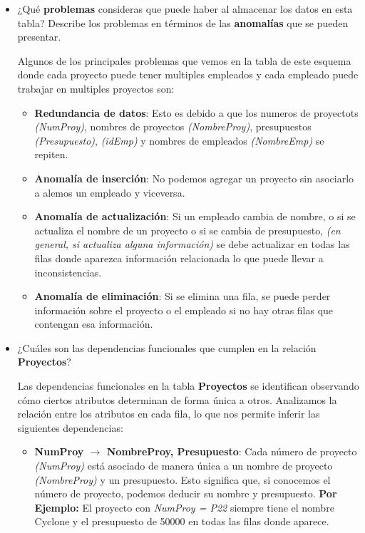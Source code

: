 \begin{itemize}

    \item ¿Qué \textbf{problemas} consideras que puede haber al almacenar los datos en esta tabla? Describe los problemas en
    términos de las \textbf{anomalías} que se pueden presentar. \vspace{1cm}

    Algunos de los principales problemas que vemos en la tabla de este esquema donde cada proyecto puede tener multiples empleados y cada empleado puede trabajar en multiples proyectos son: \vspace{1cm}

    \begin{itemize}
        \item \textbf{Redundancia de datos}: Esto es debido a que los numeros de proyectots \textit{(NumProy)}, nombres de proyectos \textit{(NombreProy)}, presupuestos \textit{(Presupuesto)}, \textit{(idEmp)} y nombres de empleados \textit{(NombreEmp)} se repiten.
        \item \textbf{Anomalía de inserción}: No podemos agregar un proyecto sin asociarlo a alemos un empleado y viceversa.
        \item \textbf{Anomalía de actualización}: Si un empleado cambia de nombre, o si se actualiza el nombre de un proyecto o si se cambia de presupuesto, \textit{(en general, si actualiza alguna información)} se debe actualizar en todas las filas donde aparezca información relacionada lo que puede llevar a inconsistencias.
        \item \textbf{Anomalía de eliminación}: Si se elimina una fila, se puede perder información sobre el proyecto o el empleado si no hay otras filas que contengan esa información. \vspace{1cm}
    \end{itemize}

    \item ¿Cuáles son las dependencias funcionales que cumplen en la relación \textbf{Proyectos}? \vspace{1cm}
    
    Las dependencias funcionales en la tabla \textbf{Proyectos} se identifican observando cómo ciertos atributos determinan de forma única a otros. Analizamos la relación entre los atributos en cada fila, lo que nos permite inferir las siguientes dependencias:

\begin{itemize}
    \item \textbf{NumProy $\rightarrow$ NombreProy, Presupuesto}: Cada número de proyecto \textit{(NumProy)} está asociado de manera única a un nombre de proyecto \textit{(NombreProy)} y un presupuesto. Esto significa que, si conocemos el número de proyecto, podemos deducir su nombre y presupuesto. \textbf{Por Ejemplo:} El proyecto con \textit{NumProy = P22} siempre tiene el nombre Cyclone y el presupuesto de 50000 en todas las filas donde aparece. \vspace{1cm}
    

\end{itemize}
\end{itemize}
